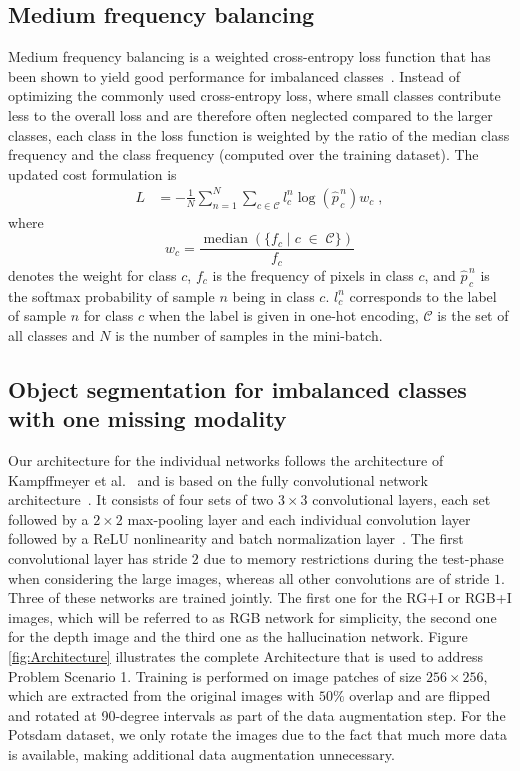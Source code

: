 \documentclass[journal]{IEEEtran}
\DeclareMathOperator{\med}{median}
\begin{document}
\subsection{Medium frequency balancing}
\label{sec:mfb}
Medium frequency balancing is a weighted cross-entropy loss function that has been shown to yield good performance for imbalanced classes~\cite{eigen2015predicting, badrinarayanan2015segnet, kampffmeyer2016semantic}. Instead of optimizing the commonly used cross-entropy loss, where small classes contribute less to the overall loss and are therefore often neglected compared to the larger classes, each class in the loss function is weighted by the ratio of the median class frequency and the class frequency (computed over the training dataset). The updated cost formulation is
\begin{align}
    L &= -\frac{1}{N} \sum_{n=1}^N \sum_{c\in\mathcal{C}} l_{c}^{n}\log\left(\widehat{p}_{\,c}^{\,n}\right) w_{c} \; ,
\end{align}
where
\begin{equation}
w_{c} = \frac{\med\left(\{f_c\;  | \; c \;\in\; \mathcal{C}\}\right)}{f_c}
\end{equation}
denotes the weight for class $c$, $f_c$ is the frequency of pixels in class $c$, and $\widehat{p}_{\,c}^{\,n}$ is the softmax probability of sample $n$ being in class $c$. $l_{c}^{n}$ corresponds to the label of sample $n$ for class $c$ when the label is given in one-hot encoding, $\mathcal{C}$ is the set of all classes and $N$ is the number of samples in the mini-batch.

\subsection{Object segmentation for imbalanced classes with one missing modality}
\label{sec:obj_seg}
Our architecture for the individual networks follows the architecture of Kampffmeyer et al.~\cite{kampffmeyer2016semantic} and is based on the fully convolutional network architecture~\cite{long2015fully}. It consists of four sets of two $3\times3$ convolutional layers, each set followed by a $2\times2$ max-pooling layer and each individual convolution layer followed by a ReLU nonlinearity and batch normalization layer~\cite{ioffe2015batch}. The first convolutional layer has stride $2$ due to memory restrictions during the test-phase when considering the large images, whereas all other convolutions are of stride $1$. Three of these networks are trained jointly. The first one for the RG+I or RGB+I images, which will be referred to as RGB network for simplicity, the second one for the depth image and the third one as the hallucination network. Figure \ref{fig:Architecture} illustrates the complete Architecture that is used to address Problem Scenario 1. Training is performed on image patches of size $256\times256$, which are extracted from the original images with $50\%$ overlap and are flipped and rotated at 90-degree intervals as part of the data augmentation step. For the Potsdam dataset, we only rotate the images due to the fact that much more data is available, making additional data augmentation unnecessary.
\end{document}
